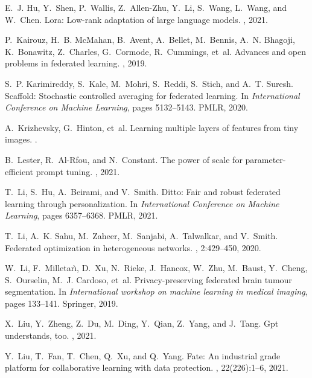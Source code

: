 \documentclass[11pt]{article}
\begin{document}
\begin{thebibliography}{10}
E.~J. Hu, Y.~Shen, P.~Wallis, Z.~Allen-Zhu, Y.~Li, S.~Wang, L.~Wang, and
  W.~Chen.
\newblock Lora: Low-rank adaptation of large language models.
, 2021.

P.~Kairouz, H.~B. McMahan, B.~Avent, A.~Bellet, M.~Bennis, A.~N. Bhagoji,
  K.~Bonawitz, Z.~Charles, G.~Cormode, R.~Cummings, et~al.
\newblock Advances and open problems in federated learning.
, 2019.

S.~P. Karimireddy, S.~Kale, M.~Mohri, S.~Reddi, S.~Stich, and A.~T. Suresh.
\newblock Scaffold: Stochastic controlled averaging for federated learning.
\newblock In {\em International Conference on Machine Learning}, pages
  5132--5143. PMLR, 2020.

A.~Krizhevsky, G.~Hinton, et~al.
\newblock Learning multiple layers of features from tiny images.
.

B.~Lester, R.~Al-Rfou, and N.~Constant.
\newblock The power of scale for parameter-efficient prompt tuning.
, 2021.

T.~Li, S.~Hu, A.~Beirami, and V.~Smith.
\newblock Ditto: Fair and robust federated learning through personalization.
\newblock In {\em International Conference on Machine Learning}, pages
  6357--6368. PMLR, 2021.

T.~Li, A.~K. Sahu, M.~Zaheer, M.~Sanjabi, A.~Talwalkar, and V.~Smith.
\newblock Federated optimization in heterogeneous networks.
, 2:429--450, 2020.

W.~Li, F.~Milletar{\`\i}, D.~Xu, N.~Rieke, J.~Hancox, W.~Zhu, M.~Baust,
  Y.~Cheng, S.~Ourselin, M.~J. Cardoso, et~al.
\newblock Privacy-preserving federated brain tumour segmentation.
\newblock In {\em International workshop on machine learning in medical
  imaging}, pages 133--141. Springer, 2019.

X.~Liu, Y.~Zheng, Z.~Du, M.~Ding, Y.~Qian, Z.~Yang, and J.~Tang.
\newblock Gpt understands, too.
, 2021.

Y.~Liu, T.~Fan, T.~Chen, Q.~Xu, and Q.~Yang.
\newblock Fate: An industrial grade platform for collaborative learning with
  data protection.
, 22(226):1--6, 2021.


\end{thebibliography}
\end{document}
